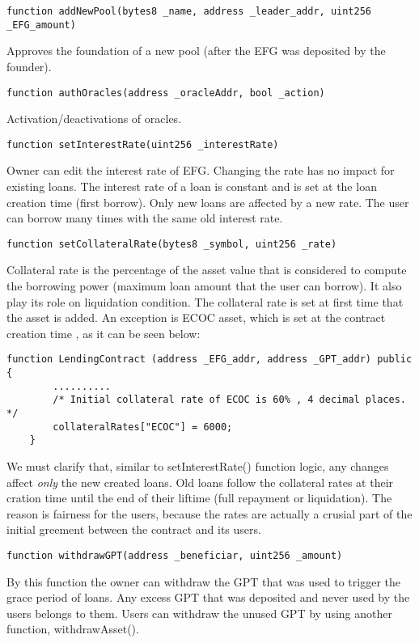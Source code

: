 \documentclass{article}
\begin{document}
\begin{lstlisting}[language=Solidity,numbers=none,escapechar=@]
function addNewPool(bytes8 _name, address _leader_addr, uint256 _EFG_amount)
\end{lstlisting}
Approves the foundation of a new pool (after the EFG was deposited by the founder).

\begin{lstlisting}[language=Solidity,numbers=none,escapechar=@]
function authOracles(address _oracleAddr, bool _action)
\end{lstlisting}
Activation/deactivations of oracles.

\begin{lstlisting}[language=Solidity,numbers=none,escapechar=@]
function setInterestRate(uint256 _interestRate)
\end{lstlisting}
Owner can edit the interest rate of EFG. Changing the rate has no impact for existing loans. The interest rate of a loan is constant and is set at the loan creation time (first borrow). Only new loans are affected by a new rate. The user can borrow many times with the same old interest rate.

\begin{lstlisting}[language=Solidity,numbers=none,escapechar=@]
function setCollateralRate(bytes8 _symbol, uint256 _rate)
\end{lstlisting}
Collateral rate is the percentage of the asset value that is considered to compute the borrowing power (maximum loan amount that the user can borrow). It also play its role on liquidation condition. The collateral rate is set at first time that the asset is added. An exception is ECOC asset, which is set at the contract creation time , as it can be seen below:
\begin{lstlisting}[language=Solidity,numbers=none,escapechar=@]
function LendingContract (address _EFG_addr, address _GPT_addr) public {
		..........
		/* Initial collateral rate of ECOC is 60% , 4 decimal places. */
		collateralRates["ECOC"] = 6000;
    }
\end{lstlisting}
We must clarify that, similar to setInterestRate() function logic, any changes affect \emph{only} the new created loans. Old loans follow the collateral rates at their cration time until the end of their liftime (full repayment or liquidation). The reason is fairness for the users, because the rates are actually a crusial part of the initial greement between the contract and its users.

\begin{lstlisting}[language=Solidity,numbers=none,escapechar=@]
function withdrawGPT(address _beneficiar, uint256 _amount)
\end{lstlisting}
By this function the owner can withdraw the GPT that was used to trigger the grace period of loans. Any excess GPT that was deposited and never used by the users belongs to them. Users can withdraw the unused GPT by using another function, withdrawAsset().
\end{document}
